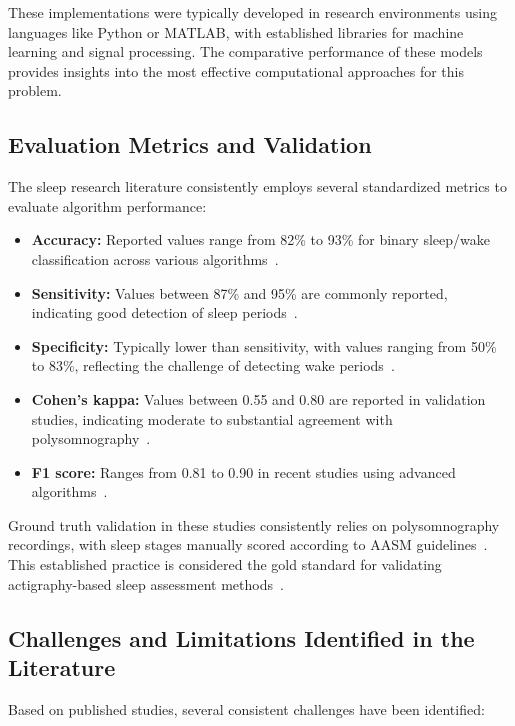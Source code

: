 \documentclass[conference]{IEEEtran}
\begin{document}
These implementations were typically developed in research environments using languages like Python or MATLAB, with established libraries for machine learning and signal processing. The comparative performance of these models provides insights into the most effective computational approaches for this problem.

\subsection{Evaluation Metrics and Validation}
The sleep research literature consistently employs several standardized metrics to evaluate algorithm performance:

\begin{itemize}
	\item \textbf{Accuracy:} Reported values range from 82\% to 93\% for binary sleep/wake classification across various algorithms~\cite{zhang2020machine, vanHees2015}.
	\item \textbf{Sensitivity:} Values between 87\% and 95\% are commonly reported, indicating good detection of sleep periods~\cite{kushida2001, sadeh2011}.
	\item \textbf{Specificity:} Typically lower than sensitivity, with values ranging from 50\% to 83\%, reflecting the challenge of detecting wake periods~\cite{sadeh2011, vanHees2015}.
	\item \textbf{Cohen's kappa:} Values between 0.55 and 0.80 are reported in validation studies, indicating moderate to substantial agreement with polysomnography~\cite{sadeh2011, kushida2001}.
	\item \textbf{F1 score:} Ranges from 0.81 to 0.90 in recent studies using advanced algorithms~\cite{zhang2020machine, behar2013}.
\end{itemize}

Ground truth validation in these studies consistently relies on polysomnography recordings, with sleep stages manually scored according to AASM guidelines~\cite{aasm2007}. This established practice is considered the gold standard for validating actigraphy-based sleep assessment methods~\cite{littner2003}.

\subsection{Challenges and Limitations Identified in the Literature}
Based on published studies, several consistent challenges have been identified:
\end{document}

